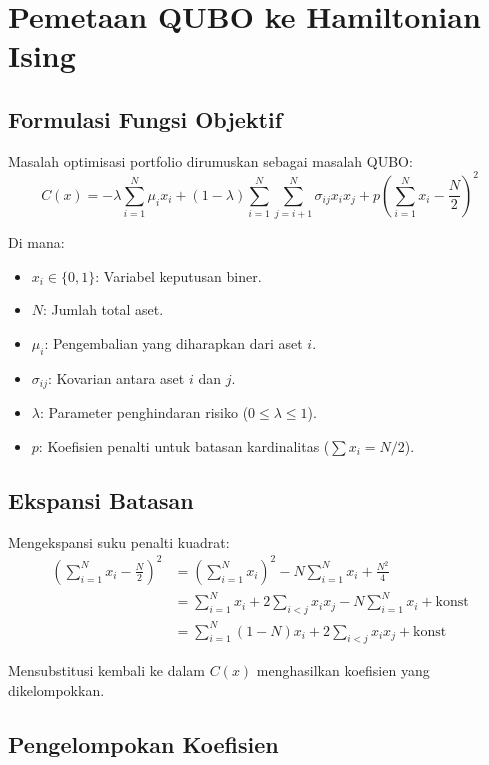 \section{Pemetaan QUBO ke Hamiltonian Ising}

\subsection{Formulasi Fungsi Objektif}

Masalah optimisasi portfolio dirumuskan sebagai masalah QUBO:
\begin{equation}
    C(x) = -\lambda \sum_{i=1}^{N} \mu_i x_i + (1-\lambda) \sum_{i=1}^{N} \sum_{j=i+1}^{N} \sigma_{ij} x_i x_j + p \left( \sum_{i=1}^{N} x_i - \frac{N}{2} \right)^2
\end{equation}

Di mana:
\begin{itemize}
    \item $x_i \in \{0, 1\}$: Variabel keputusan biner.
    \item $N$: Jumlah total aset.
    \item $\mu_i$: Pengembalian yang diharapkan dari aset $i$.
    \item $\sigma_{ij}$: Kovarian antara aset $i$ dan $j$.
    \item $\lambda$: Parameter penghindaran risiko ($0 \le \lambda \le 1$).
    \item $p$: Koefisien penalti untuk batasan kardinalitas ($\sum x_i = N/2$).
\end{itemize}

\subsection{Ekspansi Batasan}

Mengekspansi suku penalti kuadrat:
\begin{align*}
    \left( \sum_{i=1}^{N} x_i - \frac{N}{2} \right)^2 &= \left( \sum_{i=1}^{N} x_i \right)^2 - N \sum_{i=1}^{N} x_i + \frac{N^2}{4} \\
    &= \sum_{i=1}^{N} x_i + 2 \sum_{i<j} x_i x_j - N \sum_{i=1}^{N} x_i + \text{konst} \\
    &= \sum_{i=1}^{N} (1 - N) x_i + 2 \sum_{i<j} x_i x_j + \text{konst}
\end{align*}

Mensubstitusi kembali ke dalam $C(x)$ menghasilkan koefisien yang dikelompokkan.

\subsection{Pengelompokan Koefisien}

